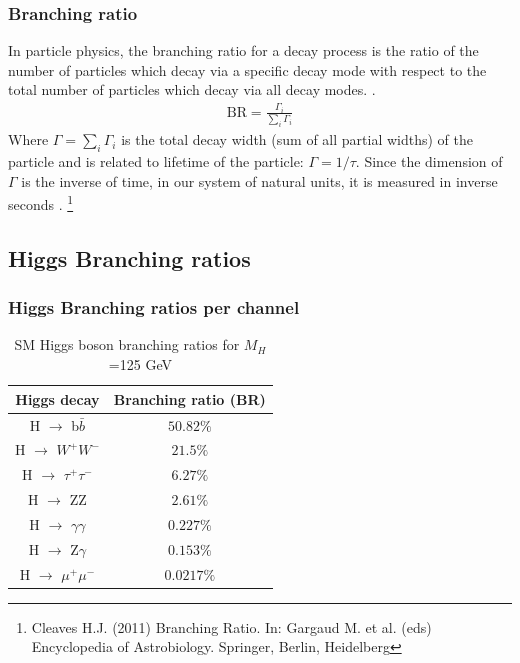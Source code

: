 \documentclass[11pt]{beamer}
\begin{document}
\begin{frame}
\frametitle{Branching ratio}
\small{In particle physics, the branching ratio for a decay process is the ratio of the number of particles which decay via a specific decay mode with respect to the total number of particles which decay via all decay modes. \footnotemark.}
\begin{align}
\text{BR} =\frac{\Gamma_i}{\sum_{i}\Gamma_i}
\end{align}
\small{Where $\Gamma=\sum_i\Gamma_i$ is the total decay width (sum of all partial widths) of the particle and is related to lifetime of the particle: $\Gamma=1/\tau$.
Since the dimension of $\Gamma$ is the inverse of time, in our system of natural units, it is measured in inverse seconds} .%
\footnote[0]{\tiny{Cleaves H.J. (2011) Branching Ratio. In: Gargaud M. et al. (eds) Encyclopedia of Astrobiology. Springer, Berlin, Heidelberg} }
\end{frame}
 


\begin{frame}
\section{Higgs Branching ratios }
\frametitle{Higgs Branching ratios per channel}
\begin{table}
	\caption*{SM Higgs boson branching ratios for  $M_H$ =125 GeV}
\begin{center}
\begin{tabular}{|c|c|}
	\hline
	Higgs decay & Branching ratio (BR)\\
	\hline
	H $\rightarrow$ b$\bar{b}$ &
	$50.82\%$ \\
	\hline
	H $\rightarrow$ $W^+W^-$ &
	$21.5\%$ \\
	\hline
	H $\rightarrow$ $\tau^+ \tau^-$ &
	$6.27\%$\\
\hline
	H $\rightarrow$ ZZ &
$2.61\%$\\
\hline
	H $\rightarrow$ $\gamma\gamma$ &
$0.227\%$\\
\hline
	H $\rightarrow$ Z$\gamma$ &
$0.153\%$\\
\hline
	H $\rightarrow$ $\mu^+\mu^-$ &
$0.0217\%$\\
\hline
\end{tabular}
\end{center}
\end{table}

\end{frame}
\end{document}
